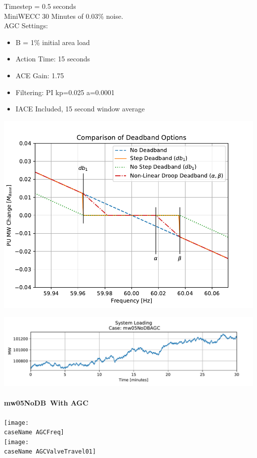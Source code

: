 \documentclass[12pt]{article}
\newcommand{\caseName}{ }
\begin{document}
\begin{minipage}{.5\linewidth}
Timestep = 0.5 seconds\\
MiniWECC 30 Minutes of 0.03\% noise. \\

AGC Settings:
\begin{itemize}
\item B = 1\% initial area load
\item Action Time: 15 seconds
\item ACE Gain: 1.75
\item Filtering: PI kp=0.025 a=0.0001
\item IACE Included, 15 second window average
\end{itemize}
\end{minipage}%
\begin{minipage}{.5\linewidth}
\includegraphics[width=\linewidth]{dbAction3}
\end{minipage}%


\includegraphics[width=\linewidth]{mw05NoDBAGCPload}\\


\pagebreak

\renewcommand{\caseName}{mw05NoDB}
\paragraph{\caseName\ With AGC} 
\begin{center}
	\texttt{[image: \\caseName AGCFreq]}\\
	\texttt{[image: \\caseName AGCValveTravel01]} \\
\end{center}
\end{document}
